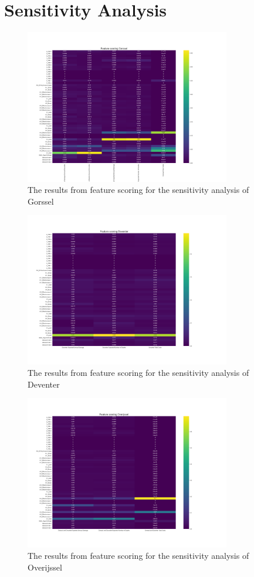\section{Sensitivity Analysis}


\begin{figure}[h!]
    \centering
    \includegraphics[width=0.8\textwidth]{report/figures/results/Feature_scoring_Gorssel_100scen.png}
    \caption{The results from feature scoring for the sensitivity analysis of Gorssel}
    \label{fig:feat-scor-g}
\end{figure}

\begin{figure}[h!]
    \centering
    \includegraphics[width=0.8\textwidth]{report/figures/results/Feature_scoring_Deventer_100scen.png}
    \caption{The results from feature scoring for the sensitivity analysis of Deventer}
    \label{fig:feat-scor-d}
\end{figure}

\begin{figure}[h!]
    \centering
    \includegraphics[width=0.8\textwidth]{report/figures/results/Feature_scoring_Overijssel_100scen.png}
    \caption{The results from feature scoring for the sensitivity analysis of Overijssel}
    \label{fig:feat-scor-o}
\end{figure}
